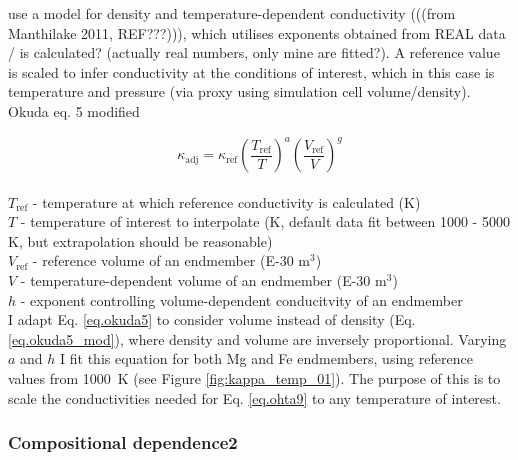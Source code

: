 \citet{Okuda2017} use a model for density and temperature-dependent conductivity (((from Manthilake 2011, REF???))), which utilises exponents obtained from REAL data / is calculated? (actually real numbers, only mine are fitted?). A reference value is scaled to infer conductivity at the conditions of interest, which in this case is temperature and pressure (via proxy using simulation cell volume/density).\\



Okuda eq. 5 modified

\begin{equation}%
\kappa_{\mathrm{adj}}=\kappa_{\mathrm{ref}}\left ( \frac{T_{\mathrm{ref}}}{T} \right )^{a}\left ( \frac{V_{\mathrm{ref}}}{V} \right )^{g}
\label{eq.okuda5_mod}
\end{equation}%
\\ $T_{\mathrm{ref}}$ - temperature at which reference conductivity is calculated (K)\\
$T$ - temperature of interest to interpolate (K, default data fit between 1000 - 5000 K, but extrapolation should be reasonable)\\   
$V_{\mathrm{ref}}$ - reference volume of an endmember (E-30 m$^3$)\\
$V$ - temperature-dependent volume of an endmember (E-30 m$^3$)\\
$h$ - exponent controlling volume-dependent conducitvity of an endmember\\

I adapt Eq. \ref{eq.okuda5} to consider volume instead of density (Eq. \ref{eq.okuda5_mod}), where density and volume are inversely proportional. Varying $a$ and $h$ I fit this equation for both Mg and Fe endmembers, using reference values from 1000~K (see Figure \ref{fig:kappa_temp_01}). The purpose of this is to scale the conductivities needed for Eq. \ref{eq.ohta9} to any temperature of interest.

\pagebreak
 
\subsubsection{Compositional dependence2}

